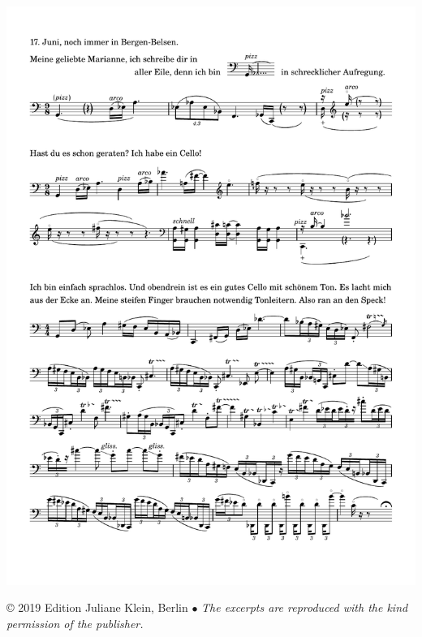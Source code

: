 \documentclass[a0paper,landscape]{baposter}
\begin{document}
\begin{poster}
{    %
    \includegraphics[width=\textwidth]{wahrheit2}
	    
	{\scriptsize © 2019 Edition Juliane Klein, Berlin $\bullet$
	\emph{The excerpts are reproduced with the kind permission of the publisher.}}
    }
\end{poster}
\end{document}
